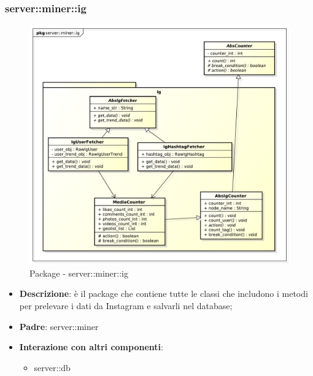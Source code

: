\subsubsection{server::miner::ig} %
\label{ssub:bdsm_app_server_miner_ig}
\begin{figure}[htbp]
	\centering
	\centerline{\includegraphics[scale=0.4]{./images/server/miner_ig.pdf}}
	\caption{Package - server::miner::ig}
\end{figure}


\begin{itemize}
  \item \textbf{Descrizione}: è il package che contiene tutte le classi che includono i metodi per prelevare i dati da Instagram e salvarli nel database;
  \item \textbf{Padre}: server::miner
   \item \textbf{Interazione con altri componenti}:
  	\begin{itemize}
  		\item server::db
  	\end{itemize}
\end{itemize}

